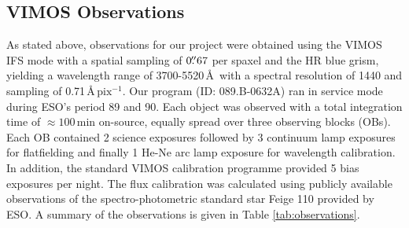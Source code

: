 	\subsection{VIMOS Observations}
		As stated above,  observations for our project were obtained using the VIMOS IFS mode with a spatial sampling of $0\hbox{$.\!\!^{\prime\prime}$}67$ per spaxel and the HR blue grism, yielding a wavelength range of 3700-5520\,\AA\ with a spectral resolution of 1440 and sampling of 0.71\,\AA\,$\mathrm{pix^{-1}}$. Our program (ID: 089.B-0632A) ran in service mode during ESO's period 89 and 90. Each object was observed with a total integration time of $\approx 100$\,min on-source, equally spread over three observing blocks (OBs). Each OB contained 2 science exposures followed by 3 continuum lamp exposures for flatfielding and finally 1 He-Ne arc lamp exposure for wavelength calibration. In addition, the standard VIMOS calibration programme provided 5 bias exposures per night. The flux calibration was calculated using publicly available observations of the spectro-photometric standard star Feige 110 provided by ESO. A summary of the observations is given in Table \ref{tab:observations}.


